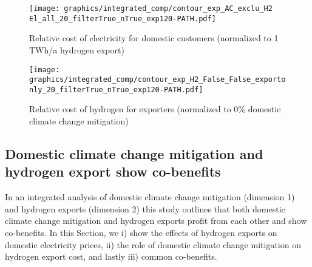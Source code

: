 \begin{figure*}[h!]
    \centering
    \begin{subfigure}[b]{0.49\linewidth}
        \centering
        \texttt{[image: graphics/integrated\_comp/contour\_exp\_AC\_exclu\_H2 El\_all\_20\_filterTrue\_nTrue\_exp120-PATH.pdf]}
        \caption{Relative cost of electricity for domestic customers (normalized to 1 TWh/a hydrogen export)}
        \label{fig:expense_ac_120}
    \end{subfigure}
    \hfill
    \begin{subfigure}[b]{0.49\linewidth}
        \centering
        \texttt{[image: graphics/integrated\_comp/contour\_exp\_H2\_False\_False\_exportonly\_20\_filterTrue\_nTrue\_exp120-PATH.pdf]}
        \caption{Relative cost of hydrogen for exporters (normalized to 0\% domestic climate change mitigation)}
        \label{fig:expense_h2_120}
    \end{subfigure}
    \hfill
    \caption{  
    Cost for domestic electricity consumers (\ref{fig:expense_ac_120}) and hydrogen exporters (\ref{fig:expense_h2_120}),
    normalized to costs at 1 TWh/a hydrogen export (\ref{fig:expense_ac_120}) and
    to 0\% \co reduction (\ref{fig:expense_h2_120})
    at each domestic climate change mitigation level. Domestic electricity consumers profit from increasing hydrogen exports, especially at low domestic climate change mitigation and high exports. Hydrogen exporters profit from domestic climate change mitigation at medium mitigation efforts. Both (\ref{fig:expense_ac_120}) and (\ref{fig:expense_h2_120}) include possible pathways of i) quick exports and slow climate change mitigation, ii) balanced exports and mitigation and iii) slow exports and quick climate change mitigation. Years are illustrative.}
    \label{fig:expenses_default_120}
\end{figure*}


\subsection*{Domestic climate change mitigation and hydrogen export show co-benefits}
\label{subsec:benefits}


In an integrated analysis of domestic climate change mitigation (dimension 1) and hydrogen exports (dimension 2) this study outlines that both domestic climate change mitigation and hydrogen exports profit from each other and show co-benefits. In this Section, we i) show the effects of hydrogen exports on domestic electricity prices, ii) the role of domestic climate change mitigation on hydrogen export cost, and lastly iii) common co-benefits.

